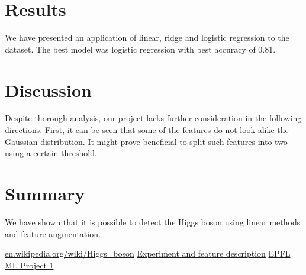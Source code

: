 \documentclass[10pt,conference,compsocconf]{IEEEtran}
\begin{document}
\section{Results}
We have presented an application of linear, ridge and logistic regression to the dataset. The best model was logistic regression with best accuracy of 0.81.
\section{Discussion}
Despite thorough analysis, our project lacks further consideration in the following directions. First, it can be seen that some of the features do not look alike the Gaussian distribution. It might prove beneficial to split such features into two using a certain threshold.
\section{Summary}
We have shown that it is possible to detect the Higgs boson using linear methods and feature augmentation.
\begin{thebibliography}{99}
 \href{https://en.wikipedia.org/wiki/Higgs\_boson}{en.wikipedia.org/wiki/Higgs\_boson}
 \href{http://higgsml.lal.in2p3.fr/files/2014/04/documentation\_v1.8.pdf}{Experiment and feature description}
 \href{http://kaggle.com/c/epfml-higgs}{EPFL ML Project 1}
\end{thebibliography}
\end{document}
